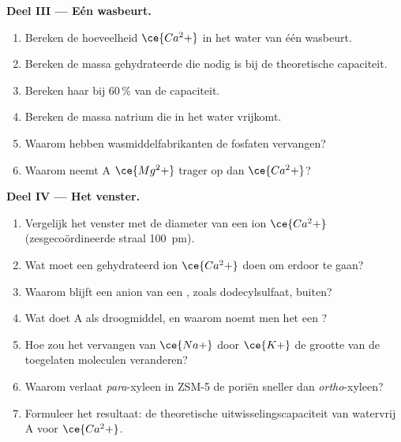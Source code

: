 \begin{problem}
\medskip\noindent\textbf{Deel III --- Eén wasbeurt.}
\begin{enumerate}[resume]
  \item Bereken de hoeveelheid $\ce{Ca^2+}$ in het water van één wasbeurt.
  \item Bereken de massa gehydrateerde  die nodig is bij de
        theoretische capaciteit.
  \item Bereken haar bij 60\,\% van de capaciteit.
  \item Bereken de massa natrium die in het water vrijkomt.
  \item Waarom hebben wasmiddelfabrikanten de fosfaten vervangen?
  \item Waarom neemt  A $\ce{Mg^2+}$ trager op dan $\ce{Ca^2+}$?
\end{enumerate}

\medskip\noindent\textbf{Deel IV --- Het venster.}
\begin{enumerate}[resume]
  \item Vergelijk het venster met de diameter van een ion $\ce{Ca^2+}$ (zesgecoördineerde straal
        \qty{100}{pm}).
  \item Wat moet een gehydrateerd ion $\ce{Ca^2+}$ doen om erdoor te gaan?
  \item Waarom blijft een anion van een , zoals
        dodecylsulfaat, buiten?
  \item Wat doet  A als droogmiddel, en waarom noemt men het een
        ?
  \item Hoe zou het vervangen van $\ce{Na+}$ door $\ce{K+}$ de grootte van de toegelaten moleculen veranderen?
  \item Waarom verlaat \textit{para}-xyleen in ZSM-5 de poriën sneller dan \textit{ortho}-xyleen?
  \item Formuleer het resultaat: de theoretische uitwisselingscapaciteit
        van watervrij  A
        voor $\ce{Ca^2+}$.
\end{enumerate}
\end{problem}
